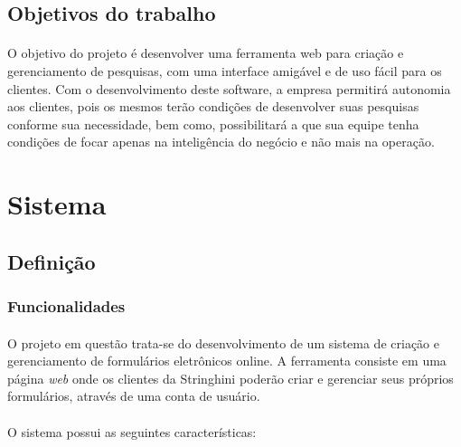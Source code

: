 \documentclass[11pt]{article}
\begin{document}
    \subsection{Objetivos do trabalho}

      \paragraph{}

      O objetivo do projeto é desenvolver uma ferramenta web para 
      criação e gerenciamento de pesquisas, com uma interface amigável e
      de uso fácil para os clientes. Com o desenvolvimento deste 
      software, a empresa permitirá autonomia aos clientes, pois os 
      mesmos terão condições de desenvolver suas pesquisas conforme sua 
      necessidade, bem como, possibilitará a que sua equipe tenha condições 
      de focar apenas na inteligência do negócio e não mais na operação.

  \newpage

  \section{Sistema}

    \subsection{Definição}
    
      \subsubsection{Funcionalidades}

      \paragraph{}
      
      O projeto em questão trata-se do desenvolvimento de um sistema 
      de  criação e gerenciamento de formulários eletrônicos online. A
      ferramenta consiste em uma página {\em web} onde os clientes da
      Stringhini poderão criar e gerenciar seus próprios formulários, 
      através de uma conta de usuário.
      
      \paragraph{}
      
      O sistema possui as seguintes características:
\end{document}
